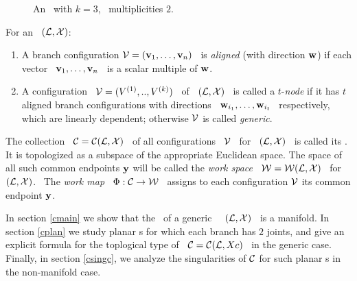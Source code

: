 \begin{figure}[h]
\begin{center}
\epsfysize=5cm %
\leavevmode {} \caption{An \smech\
with $k=3$, \ multiplicities $2$.} \label{fig:mechanism}
\end{center}
\end{figure}

\begin{defn}
\label{def:aligned}

 For an \smech \ $(\mathcal{L},\mathcal{X})$:

\begin{enumerate}
\item A branch configuration $\mathcal{V}=(\mathbf{v}_1,\dotsc,\mathbf{v}_n)$ \ is
\emph{aligned} (with direction $\mathbf{w}$) if each vector \
$\mathbf{v}_1,\dotsc,\mathbf{v}_n$ \ is a scalar multiple of $\mathbf{w}$. \item A
configuration \ $\mathcal{V}=(V\sp{({1})},..,V\sp{({k})})$ \ of \ $(\mathcal{L},\mathcal{X})$ \ is
called  a $t$-\emph{node} if it has $t$ aligned  branch
configurations with directions \ $\mathbf{w}_{i_{1}},\dots,\mathbf{w}_{i_{t}}$ \
respectively, which are linearly dependent; otherwise $\mathcal{V}$ is
called \emph{generic}.
\end{enumerate}
\end{defn}


\begin{defn}
The collection \ $\mathcal{C}=\mathcal{C}(\mathcal{L},\mathcal{X})$ \ of all configurations \ $\mathcal{V}$
\ for \ $(\mathcal{L},\mathcal{X})$ \ is called its \emph{\cspace}. It is
topologized as a subspace of the appropriate Euclidean space. The
space of all such common endpoints $\mathbf{y}$ will be called the
\emph{work space} \ $\mathcal{W}=\mathcal{W}(\mathcal{L},\mathcal{X})$ \  for \ $(\mathcal{L},\mathcal{X})$. \ The
\emph{work map} \ $\Phi:\mathcal{C}\to\mathcal{W}$ \ assigns to each configuration
$\mathcal{V}$ its common endpoint $\mathbf{y}$.
\end{defn}


\begin{org} \label{sorg} In section \ref{cmain} we show that the \cspace\ of a generic
 \smech\ \ $(\mathcal{L},\mathcal{X})$ \ is a manifold. In section \ref{cplan} we study planar
  \smech s for which each branch has $2$ joints, and give an explicit formula
  for the toplogical type of \ $\mathcal{C}=\mathcal{C}(\mathcal{L},Xc)$ \ in the generic case. Finally,
   in section \ref{csingc}, we analyze the singularities of $\mathcal{C}$ for such planar
    \smech s in the non-manifold case.
\end{org}
%
%
 \label{cmain}

